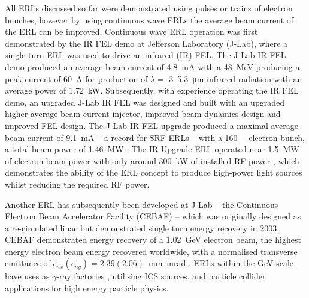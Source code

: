\documentclass[../main.tex]{subfiles}
\begin{document}
All ERLs discussed so far were demonstrated using pulses or trains of electron bunches, however by using continuous wave ERLs the average beam current of the ERL can be improved. Continuous wave ERL operation was first demonstrated \cite{neil2000sustained} by the IR FEL demo \cite{benson1999first,neil2000sustained} at Jefferson Laboratory (J-Lab), where a single turn ERL was used to drive an infrared (IR) FEL. The J-Lab IR FEL demo produced an average beam current of 4.8~\si{\milli\ampere} with a 48~\si{\mega\electronvolt} producing a peak current of 60~\si{\ampere} for production of $\lambda =$ 3--5.3~\si{\micro\meter} infrared radiation with an average power of 1.72~\si{\kilo\watt}. Subsequently, with experience operating the IR FEL demo, an upgraded J-Lab IR FEL was designed \cite{benson2002have} and built \cite{behre2004first} with an upgraded higher average beam current injector, improved beam dynamics design and improved FEL design. The J-Lab IR FEL upgrade produced a maximal average beam current of 9.1~\si{\milli\ampere} -- a record for SRF ERLs -- with a 160~\si{\mega\electonvolt} electron bunch, a total beam power of 1.46~\si{\mega\watt} \cite{neil2006jlab}. The IR Upgrade ERL operated near 1.5~\si{\mega\watt} of electron beam power with only around 300~\si{\kilo\watt} of installed RF power \cite{adolphsen2022european}, which demonstrates the ability of the ERL concept to produce high-power light sources whilst reducing the required RF power.  

Another ERL has subsequently been developed at J-Lab -- the Continuous Electron Beam Accelerator Facility (CEBAF) \cite{bogacz2003cebaf,tennant2003beam} -- which was originally designed as a re-circulated linac but demonstrated single turn energy recovery in 2003. CEBAF demonstrated energy recovery of a 1.02~\si{\giga\electronvolt} electron beam, the highest energy electron beam energy recovered worldwide, with a normalised transverse emittance of $\epsilon_{nx} \left(\epsilon_{ny}\right) = 2.39 \left(2.06\right)$~\si{\milli\meter}--\si{\milli\radian} \cite{tennant2003beam}. ERLs within the \si{\giga\electronvolt}-scale have uses as $\gamma$-ray factories \cite{budker2021expanding}, utilising ICS sources, and particle collider applications \cite{agostini2021large} for high energy particle physics. 
\end{document}
